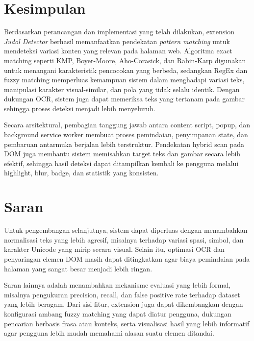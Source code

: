 \section{Kesimpulan}

Berdasarkan perancangan dan implementasi yang telah dilakukan, extension \textit{Judol Detector} berhasil memanfaatkan pendekatan \textit{pattern matching} untuk mendeteksi variasi konten yang relevan pada halaman web. Algoritma exact matching seperti KMP, Boyer-Moore, Aho-Corasick, dan Rabin-Karp digunakan untuk menangani karakteristik pencocokan yang berbeda, sedangkan RegEx dan fuzzy matching memperluas kemampuan sistem dalam menghadapi variasi teks, manipulasi karakter visual-similar, dan pola yang tidak selalu identik. Dengan dukungan OCR, sistem juga dapat memeriksa teks yang tertanam pada gambar sehingga proses deteksi menjadi lebih menyeluruh.

Secara arsitektural, pembagian tanggung jawab antara content script, popup, dan background service worker membuat proses pemindaian, penyimpanan state, dan pembaruan antarmuka berjalan lebih terstruktur. Pendekatan hybrid scan pada DOM juga membantu sistem memisahkan target teks dan gambar secara lebih efektif, sehingga hasil deteksi dapat ditampilkan kembali ke pengguna melalui highlight, blur, badge, dan statistik yang konsisten.

\section{Saran}

Untuk pengembangan selanjutnya, sistem dapat diperluas dengan menambahkan normalisasi teks yang lebih agresif, misalnya terhadap variasi spasi, simbol, dan karakter Unicode yang mirip secara visual. Selain itu, optimasi OCR dan penyaringan elemen DOM masih dapat ditingkatkan agar biaya pemindaian pada halaman yang sangat besar menjadi lebih ringan.

Saran lainnya adalah menambahkan mekanisme evaluasi yang lebih formal, misalnya pengukuran precision, recall, dan false positive rate terhadap dataset yang lebih beragam. Dari sisi fitur, extension juga dapat dikembangkan dengan konfigurasi ambang fuzzy matching yang dapat diatur pengguna, dukungan pencarian berbasis frasa atau konteks, serta visualisasi hasil yang lebih informatif agar pengguna lebih mudah memahami alasan suatu elemen ditandai.

